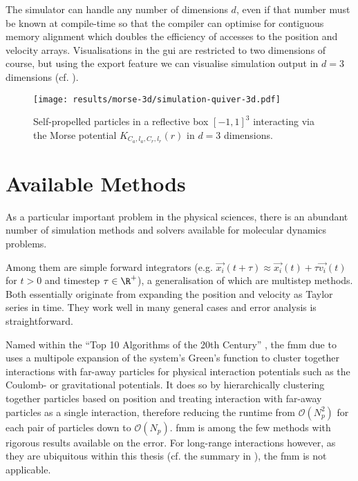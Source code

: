 The simulator can handle any number of dimensions $d$, even if that number must be known at compile-time so that the compiler can optimise for contiguous memory alignment which doubles the efficiency of accesses to the position and velocity arrays.
Visualisations in the \gls{gui} are restricted to two dimensions of course, but using the export feature we can visualise simulation output in $d=3$ dimensions (cf. ).

\begin{figure}[H]
  \centering
  \texttt{[image: results/morse-3d/simulation-quiver-3d.pdf]}
  \caption[Self-propelled particles in 3D interacting through $K_{C_a, l_a, C_r, l_r}(r)$.]{Self-propelled particles in a reflective box $[-1, 1]^3$ interacting via the Morse potential $K_{C_a, l_a, C_r, l_r}(r)$ in $d=3$ dimensions.}
  \label{fig:morse-3d-quiver}
\end{figure}

\section{Available Methods}
As a particular important problem in the physical sciences, there is an abundant number of simulation methods and solvers available for molecular dynamics problems.

Among them are simple forward integrators (e.g. $\vec{x_i}(t + \tau) \approx \vec{x_i}(t) + \tau \vec{v_i}(t)$ for $t > 0$ and timestep $\tau \in \R^+$), a generalisation of which are multistep methods.
Both essentially originate from expanding the position and velocity as Taylor series in time.
They work well in many general cases and error analysis is straightforward.

Named within the ``Top 10 Algorithms of the 20th Century'' \parencite{2000-top-algorithms}, the \gls{fmm} due to \cite{1987-multipole-method} uses a multipole expansion of the system's Green's function to cluster together interactions with far-away particles for physical interaction potentials such as the Coulomb- or gravitational potentials.
It does so by hierarchically clustering together particles based on position and treating interaction with far-away particles as a single interaction, therefore reducing the runtime from $\mathcal{O}(N_p^2)$ for each pair of particles down to $\mathcal{O}(N_p)$.
\gls{fmm} is among the few methods with rigorous results available on the error.
For long-range interactions however, as they are ubiquitous within this thesis (cf. the summary in ), the \gls{fmm} is not applicable.

